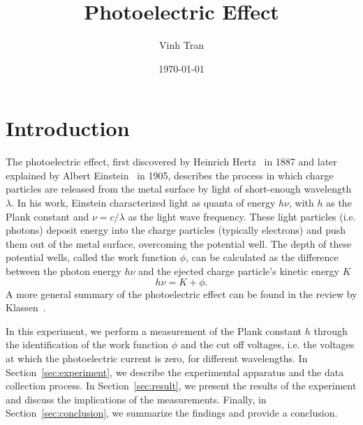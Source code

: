 \documentclass[aps,twocolumn,secnumarabic,balancelastpage,amsmath,amssymb,nofootinbib,floatfix]{revtex4-1}
\begin{document}
\title{Photoelectric Effect}

\author{Vinh Tran}

\date{\today}


\begin{abstract}

\end{abstract}

\maketitle


\section{Introduction}
\label{sec:intro}

The photoelectric effect, first discovered by Heinrich Hertz~\citep{1Hertz887} in 1887 and later explained by Albert Einstein~\cite{Einstein1905} in 1905, describes the process in which charge particles are released from the metal surface by light of short-enough wavelength $\lambda$. In his work, Einstein characterized light as quanta of energy $h \nu$, with $h$ as the Plank constant and $\nu = c/\lambda$ as the light wave frequency. These light particles (i.e. photons) deposit energy into the charge particles (typically electrons) and push them out of the metal surface, overcoming the potential well. The depth of these potential wells, called the work function $\phi$, can be calculated as the difference between the photon energy $h \nu$ and the ejected charge particle's kinetic energy $K$
\begin{equation}
    \label{eqn:work_function}
    h \nu = K + \phi.
\end{equation}
A more general summary of the photoelectric effect can be found in the review by Klassen~\citep{Klassen2011}.

In this experiment, we perform a measurement of the Plank constant $h$ through the identification of the work function $\phi$ and the cut off voltages, i.e. the voltages at which the photoelectric current is zero, for different wavelengths. In Section~\ref{sec:experiment}, we describe the experimental apparatus and the data collection process. In Section~\ref{sec:result}, we present the results of the experiment and discuss the implications of the measurements. Finally, in Section~\ref{sec:conclusion}, we summarize the findings and provide a conclusion.
\end{document}
